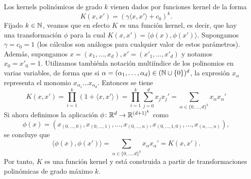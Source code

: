 \begin{ex}
    Los kernels polinómicos de grado $k$ vienen dados por funciones kernel de la forma
    \[ K(x,x') = (\gamma \langle x,x' \rangle + c_0)^k. \]
    Fijado $k \in \mathbb{N}$, veamos que en efecto $K$ es una función kernel, es decir, que hay una transformación $\phi$ para la cual $K(x,x') = \langle \phi(x),\phi(x') \rangle$. Supongamos $\gamma = c_0 = 1$ (los cálculos son análogos para cualquier valor de estos parámetros). Además, supongamos $x = (x_1,\dots,x_d), x' = (x'_1,\dots,x'_d)$ y notamos $x_0 = x'_0 = 1$. Utilizamos tambiénla notación multiíndice de los polinomios en varias variables, de forma que si $\alpha = (\alpha_1,\dots,\alpha_d) \in (\mathbb{N}\cup\{0\})^d$, la expresión $x_{\alpha}$ representa el monomio $x_{\alpha_1}\dots x_{\alpha_d}$. Entonces se tiene
    \begin{equation*}
        K(x,x') = \prod_{i=1}^k (1 + \langle x, x' \rangle) 
                = \prod_{i=1}^k \sum_{j=0}^d x_jx_j' 
                = \sum_{\alpha \in \{0,\dots,d\}^k} x_{\alpha} x_{\alpha}'
    \end{equation*}
    Si ahora definimos la aplicación $\phi \colon \mathbb{R}^d \to \mathbb{R}^{(d+1)^k}$ como
    \[\phi(x) = (x_{(0,\dots,0)},x_{(0,\dots,1)},\dots,x_{(0,\dots,n)},x_{(0,\dots,1,0)},\dots,x_{(n,\dots,n)}),\]
    se concluye que 
    \[ \langle \phi(x), \phi(x') \rangle = \sum_{\alpha \in \{0,\dots,d\}^k} x_{\alpha} x_{\alpha}' = K(x,x'). \]
    Por tanto, $K$ es una función kernel y está construida a partir de transformaciones polinómicas de grado máximo $k$.
\end{ex}

